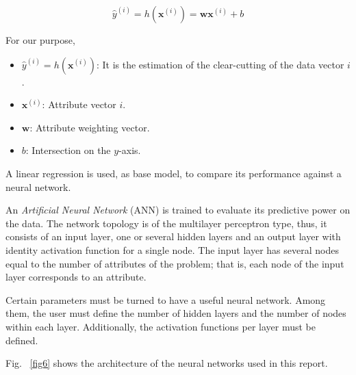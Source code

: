 \documentclass[conference]{IEEEtran}
\begin{document}
\begin{equation}
\label{eq1}
\hat{y}^{(i)} = h(\boldsymbol{x}^{(i)}) = \boldsymbol{w} \boldsymbol{x}^{(i)}+b
\end{equation}

For our purpose,
\begin{itemize}
	\item $\hat{y}^{(i)} = h(\boldsymbol{x}^{(i)})$: It is the estimation of the clear-cutting of the data vector $i$.
	\item $\boldsymbol{x}^{(i)}$: Attribute vector $i$.
	\item $\boldsymbol{w}$:  Attribute weighting vector.
	\item $b$: Intersection on the $y$-axis.
\end{itemize}

A linear regression is used, as base model, to compare its performance against a neural network.

An \textit{Artificial Neural Network} (ANN) is trained to evaluate its predictive power on the data. The network topology is of the multilayer perceptron type, thus, it consists of an input layer, one or several hidden layers and an output layer with identity activation function for a single node. The input layer has several nodes equal to the number of attributes of the problem; that is, each node of the input layer corresponds to an attribute.

Certain parameters must be turned to have a useful neural network. Among them, the user must define the number of hidden layers and the number of nodes within each layer. Additionally, the activation functions per layer must be defined.

Fig. ~\ref{fig6} shows the architecture of the neural networks used in this report.
\end{document}
